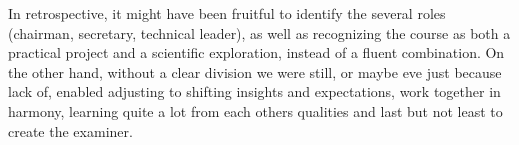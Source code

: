 In retrospective, it might have been fruitful to identify the several roles 
(chairman, secretary, technical leader), as well as recognizing the course as
both a practical project and a scientific exploration, instead of a fluent
combination. On the other hand, without a clear division we were still, or maybe
eve just because lack of, enabled adjusting to shifting insights and expectations, work together in harmony, learning quite a lot from each others qualities and last but not least to create the \gls{examiner}.
